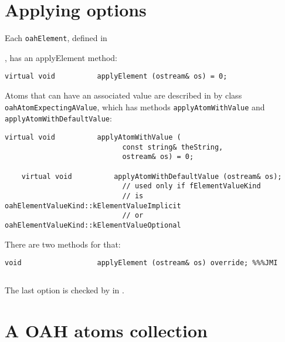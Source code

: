 \section{Applying options}

Each {\tt oahElement}, defined in {, has an applyElement {\tt } method:
\begin{lstlisting}[language=CPlusPlus]
    virtual void          applyElement (ostream& os) = 0;
\end{lstlisting}

Atoms that can have an associated value are described in  by class {\tt oahAtomExpectingAValue}, which has methods {\tt applyAtomWithValue} and {\tt applyAtomWithDefaultValue}:
\begin{lstlisting}[language=CPlusPlus]
    virtual void          applyAtomWithValue (
                            const string& theString,
                            ostream& os) = 0;

    virtual void          applyAtomWithDefaultValue (ostream& os);
                            // used only if fElementValueKind
                            // is oahElementValueKind::kElementValueImplicit
                            // or oahElementValueKind::kElementValueOptional
\end{lstlisting}

There are two methods for that:%
\begin{lstlisting}[language=CPlusPlus]
    void                  applyElement (ostream& os) override; %%%JMI
\end{lstlisting}

\begin{lstlisting}[language=CPlusPlus]

\end{lstlisting}

The last option is checked by  in . %


\section{A OAH atoms collection}

}
